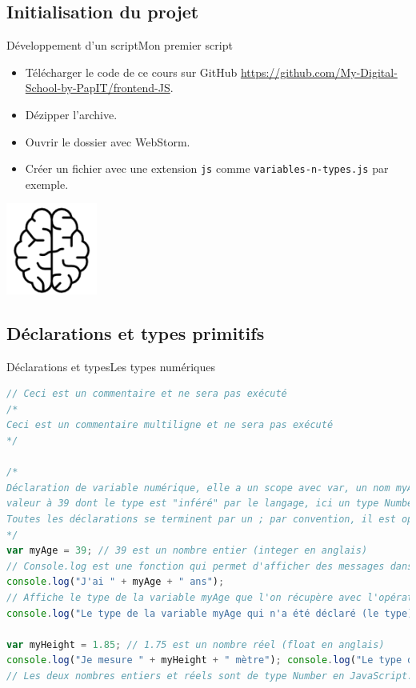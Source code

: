 \documentclass{beamer}
\begin{document}
    \subsection{Initialisation du projet}\label{subsec:projectinit}

    \begin{frame}{Développement d'un script}{Mon premier script}
        \begin{itemize}
            \item Télécharger le code de ce cours sur GitHub
            \url{https://github.com/My-Digital-School-by-PapIT/frontend-JS}.
            \item Dézipper l'archive.
            \item Ouvrir le dossier avec WebStorm.
            \item Créer un fichier avec une extension
            \lstinline{js} comme \lstinline{variables-n-types.js} par exemple.
        \end{itemize}
        \bigbreak
        \centering
        \includegraphics[width=3cm]{image/intelligence}
    \end{frame}

    \subsection{Déclarations et types primitifs}\label{subsec:declare-n-types}

    \begin{frame}[fragile]{Déclarations et types}{Les types numériques}
        \begin{lstlisting}[language=JavaScript,title={\tiny{Script JavaScript}},basicstyle=\tiny\ttfamily]
// Ceci est un commentaire et ne sera pas exécuté
/*
Ceci est un commentaire multiligne et ne sera pas exécuté
*/

/*
Déclaration de variable numérique, elle a un scope avec var, un nom myAge et une
valeur à 39 dont le type est "inféré" par le langage, ici un type Number.
Toutes les déclarations se terminent par un ; par convention, il est optionnel.
*/
var myAge = 39; // 39 est un nombre entier (integer en anglais)
// Console.log est une fonction qui permet d'afficher des messages dans la console
console.log("J'ai " + myAge + " ans");
// Affiche le type de la variable myAge que l'on récupère avec l'opérateur typeof
console.log("Le type de la variable myAge qui n'a été déclaré (le type) est " + typeof myAge);

var myHeight = 1.85; // 1.75 est un nombre réel (float en anglais)
console.log("Je mesure " + myHeight + " mètre"); console.log("Le type de la variable myHeight qui n'a été déclaré (le type) est " + typeof myHeight);
// Les deux nombres entiers et réels sont de type Number en JavaScript.
        \end{lstlisting}
    \end{frame}
\end{document}
